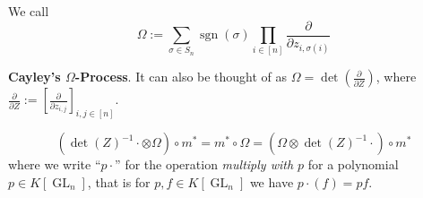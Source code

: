 \begin{definition}
  We call
  \begin{equation}
    \Omega := \sum_{\sigma \in S_n} \operatorname{sgn} \left( \sigma \right) \prod_{ i \in [ n ] } \frac{\partial}{\partial z_{i , \sigma \left( i \right)}}
  \end{equation}
\end{definition}
\textbf{Cayley's $\Omega$-Process}.
It can also be thought of as $ \Omega = \operatorname{det} \left( \frac{\partial}{\partial Z} \right) $, where $\frac{\partial}{\partial Z} := \left\lbrack \frac{\partial}{\partial z_{i,j}} \right\rbrack_{i,j \in [ n ]} $.

\begin{lemma}
  \begin{equation}
    \left( \operatorname{det} \left( Z \right) ^{-1} {\cdot} \otimes \Omega \right) \circ m^\ast
    = m^\ast \circ \Omega
    = \left( \Omega \otimes \operatorname{det} \left( Z \right) ^{-1} {\cdot} \right) \circ m^\ast
  \end{equation}
  where we write ``$ p {\cdot} $'' for the operation \textit{multiply with $ p $} for a polynomial $ p \in K \left\lbrack \operatorname{GL}_n \right\rbrack $, that is for $p,f \in K[\operatorname{GL}_n]$ we have $p{\cdot}(f) = pf$.
\end{lemma}

